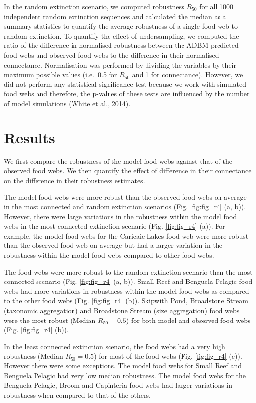 \documentclass{article}
\begin{document}
In the random extinction scenario, we computed robustness \(R_{50}\) for
all 1000 independent random extinction sequences and calculated the
median as a summary statistics to quantify the average robustness of a
single food web to random extinction. To quantify the effect of
undersampling, we computed the ratio of the difference in normalised
robustness between the ADBM predicted food webs and observed food webs
to the difference in their normalised connectance. Normalisation was
performed by dividing the variables by their maximum possible values
(i.e.~0.5 for \(R_{50}\) and 1 for connectance). However, we did not
perform any statistical significance test because we work with simulated
food webs and therefore, the p-values of these tests are influenced by
the number of model simulations (White et al., 2014).

\hypertarget{results}{%
\section{Results}\label{results}}

We first compare the robustness of the model food webs against that of
the observed food webs. We then quantify the effect of difference in
their connectance on the difference in their robustness estimates.

The model food webs were more robust than the observed food webs on
average in the most connected and random extinction scenarios (Fig.
\ref{fig:fig_r4} (a, b)). However, there were large variations in the
robustness within the model food webs in the most connected extinction
scenario (Fig. \ref{fig:fig_r4} (a)). For example, the model food webs
for the Caricaie Lakes food web were more robust than the observed food
web on average but had a larger variation in the robustness within the
model food webs compared to other food webs.

The food webs were more robust to the random extinction scenario than
the most connected scenario (Fig. \ref{fig:fig_r4} (a, b)). Small Reef
and Benguela Pelagic food webs had more variations in robustness within
the model food webs as compared to the other food webs (Fig.
\ref{fig:fig_r4} (b)). Skipwith Pond, Broadstone Stream (taxonomic
aggregation) and Broadstone Stream (size aggregation) food webs were the
most robust (Median \(R_{50} = 0.5\)) for both model and observed food
webs (Fig. \ref{fig:fig_r4} (b)).

In the least connected extinction scenario, the food webs had a very
high robustness (Median \(R_{50} = 0.5\)) for most of the food webs
(Fig. \ref{fig:fig_r4} (c)). However there were some exceptions. The
model food webs for Small Reef and Benguela Pelagic had very low median
robustness. The model food webs for the Benguela Pelagic, Broom and
Capinteria food webs had larger variations in robustness when compared
to that of the others.
\end{document}
